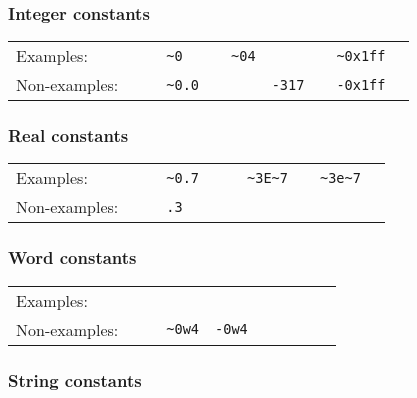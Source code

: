 \documentclass[fleqn,a4paper]{article}
\begin{document}
\subsubsection*{Integer constants}

\begin{quot}
\begin{tabular}{@{}lcllllllll}
Examples:   & &  \verb#0# & \verb#~0# & \verb#4# & \verb#~04# &
\verb#999999# & \verb#0xFFFF# & \verb#~0x1ff#\\
Non-examples: & & \verb#0.0# & \verb#~0.0# & \verb#4.0# & \verb#1E0# &
\verb#-317# & \verb#0XFFFF# & \verb#-0x1ff#\\
\end{tabular}
\end{quot}


\subsubsection*{Real constants}

\begin{quot}
\begin{tabular}{@{}lcllllllll}
Examples:   & &  \verb#0.7# & \verb#~0.7# & \verb#3.32E5# & \verb#3E~7#
 & \verb#~3E~7#  & \verb#3e~7# & \verb#~3e~7#\\
Non-examples: & & \verb#23# & \verb#.3# & \verb#4.E5# & \verb#1E2.0# & 
  \verb#1E+7# & \verb#1E-7#
\end{tabular}
\end{quot}


\subsubsection*{Word constants}

\begin{quot}
\begin{tabular}{@{}lcllllllll}
Examples:   & &  \verb#0w0# & \verb#0w4# & \verb#0w999999# &
\verb#0wxFFFF#  & \verb#0wx1ff#\\
Non-examples: & & \verb#0w0.0# & \verb#~0w4# & \verb#-0w4# & \verb#0w1E0# &
\verb#0wXFFFF# & \verb#0WxFFFF#\\
\end{tabular}
\end{quot}


\subsubsection*{String constants}
\end{document}
